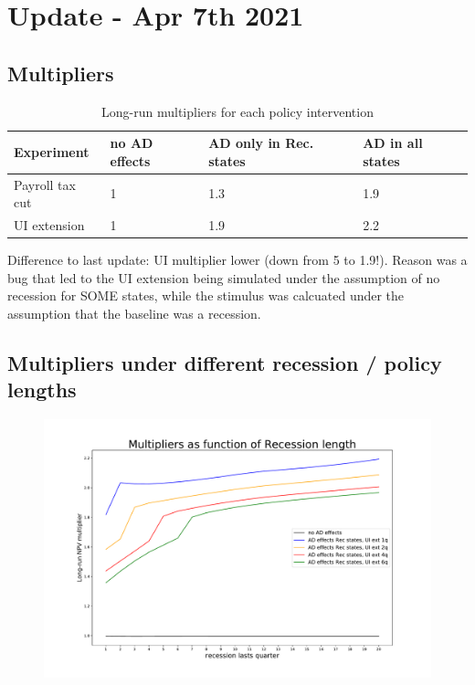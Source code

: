 \documentclass[]{article}
\begin{document}
	
\section{Update - Apr 7th 2021}

\subsection{Multipliers}
\begin{table}[htb]
	\centering
	\begin{tabular}{@{}llll@{}}
		\toprule
		Experiment  	& no AD effects & AD only in Rec. states 	& AD in all states \\ \midrule
		Payroll tax cut & 1 			& 1.3   			& 1.9  \\
		UI extension    & 1 			& 1.9 				& 2.2     \\ \bottomrule
	\end{tabular}	
	\caption{Long-run multipliers for each policy intervention }
	\label{tab:NPVADelas}
\end{table}

Difference to last update: UI multiplier lower (down from 5 to 1.9!). Reason was a bug that led to the UI extension being simulated under the assumption of no recession for SOME states, while the stimulus was calcuated under the assumption that the baseline was a recession.

\FloatBarrier
\subsection{Multipliers under different recession / policy lengths}
\begin{figure}[h]
	\centering
	\includegraphics[width=1\linewidth]{../FullRun_Apr04_AD05_AllStates/Multipliers_RecLength_PolicyLength1}
	\caption{}
	\label{fig:multipliersreclengthpolicylength1}
\end{figure}
\end{document}
